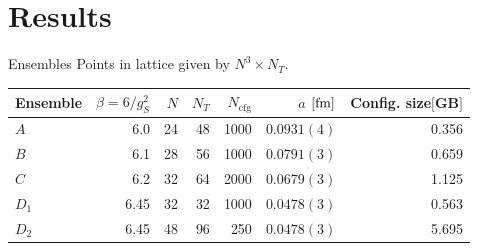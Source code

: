 \documentclass[10pt,show notes on second screen]{beamer}
\begin{document}
\section{Results}

\begin{frame}{Ensembles}
Points in lattice given by $N^3 \times N_T$.
\begin{table}
    \centering
    \begin{tabular}{l r r r r r r}
        \toprule
        Ensemble & $\beta=6/g_S^2$ & $N$ & $N_T$ & $N_\mathrm{cfg}$ & $a$ $[\mathrm{fm}]$ & Config. size$[$GB$]$ \\ 
        \midrule
        $A$   & 6.0  & 24 & 48 & 1000 & $0.0931(4)$ & 0.356 \\
        $B$   & 6.1  & 28 & 56 & 1000 & $0.0791(3)$ & 0.659 \\
        $C$   & 6.2  & 32 & 64 & 2000 & $0.0679(3)$ & 1.125 \\
        $D_1$ & 6.45 & 32 & 32 & 1000 & $0.0478(3)$ & 0.563 \\
        $D_2$ & 6.45 & 48 & 96 & 250  & $0.0478(3)$ & 5.695 \\
        \bottomrule
    \end{tabular}
\end{table}
\end{frame}
\end{document}
